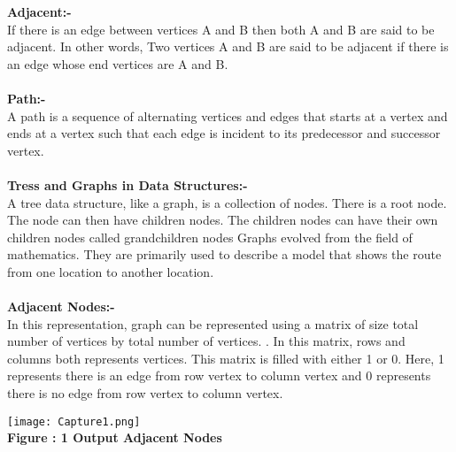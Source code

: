 \documentclass[11pt]{article}            %
\begin{document}
\textbf{Adjacent:-}\\
If there is an edge between vertices A and B then both A and B are said to be adjacent. In other words, Two vertices A and B are said to be adjacent if there is an edge whose end vertices are A and B. \\ \\

\textbf{Path:-}\\
A path is a sequence of alternating vertices and edges that starts at a vertex and ends at a vertex such that each edge is incident to its predecessor and successor vertex. \\ \\

\textbf{Tress and Graphs in Data Structures:-}\\
A tree data structure, like a graph, is a collection of nodes. There is a root node. The node can then have children nodes. The children nodes can have their own children nodes called grandchildren nodes
Graphs evolved from the field of mathematics. They are primarily used to describe a model that shows the route from one location to another location. \\ \\

\textbf{Adjacent Nodes:-}\\
In this representation, graph can be represented using a matrix of size total number of vertices by total number of vertices. . In this matrix, rows and columns both represents vertices. This matrix is filled with either 1 or 0. Here, 1 represents there is an edge from row vertex to column vertex and 0 represents there is no edge from row vertex to column vertex.
\begin{center}
 \texttt{[image: Capture1.png]}\\ 
\textbf{Figure : 1 Output Adjacent Nodes}
\vskip 0.5cm
\end{center}


 
\end{document}

